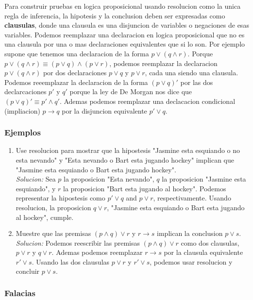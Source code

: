\documentclass[]{article}
\begin{document}
Para construir pruebas en logica proposicional usando resolucion como la unica regla de inferencia, la hipotesis y la conclusion deben ser expresadas como \textbf{clausulas}, donde una clausula es una disjuncion de variables o negaciones de esas variables. Podemos reemplazar una declaracion en logica proposicional que no es una clausula por una o mas declaraciones equivalentes que si lo son. Por ejemplo supone que tenemos una declaracion de la forma $p \vee (q \wedge r)$. Porque $p \vee (q \wedge r) \equiv (p \vee q) \wedge (p \vee r)$, podemos reemplazar la declaracion $p \vee (q \wedge r)$ por dos declaraciones $p \vee q$ y $p \vee r$, cada una siendo una clausula. Podemos reeemplazar la declaracion de la forma $(p \vee q)'$ por las dos declarcaciones $p'$ y $q'$ porque la ley de De Morgan nos dice que $(p \vee q)' \equiv p' \wedge q'$. Ademas podemos reemplazar una declacacion condicional (impliacion) $p \rightarrow q$ por la disjuncion equivalente $p' \vee q$. 

\subsubsection*{Ejemplos}

\begin{enumerate}
	\item Use resolucion para mostrar que la hipostesis "Jasmine esta esquiando o no esta nevando" y "Esta nevando o Bart esta jugando hockey" implican que "Jasmine esta esquiando o Bart esta jugando hockey".\\
	\textit{Solucion:} Sea $p$ la proposicion "Esta nevando", $q$ la proposicion "Jasmine esta esquiando", y $r$ la proposicion "Bart esta jugando al hockey". Podemos representar la hipostesis como $p' \vee q$ and $p \vee r$, respectivamente. Usando resolucion, la proposicion $q \vee r$, "Jasmine esta esquiando o Bart esta jugando al hockey", cumple.

	\item Muestre que las premisas $(p \wedge q) \vee r$ y $r \rightarrow s$ implican la conclusion $p \vee s$.\\
	\textit{Solucion:} Podemos reescribir las premisas $(p \wedge q) \vee r$ como dos clausulas, $p \vee r$ y $q \vee r$. Ademas podemos reemplazar $r \rightarrow s$ por la clausula equivalente $r' \vee s$. Usando las dos clausulas $p \vee r$ y $r' \vee s$, podemos usar resolucion y concluir $p \vee s$.
\end{enumerate}

\subsubsection*{Falacias}
\end{document}
